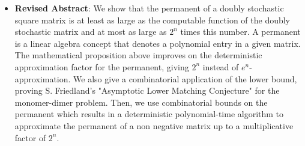 \documentclass[11pt,twocolumn]{article}
\begin{document}
\begin{itemize}
  \item{\bf{Revised Abstract}}: We show that the permanent of a doubly stochastic square matrix  is at least as large as the computable function of the doubly stochastic matrix and at most as large as $2^n$ times this number. A permanent is a linear algebra concept that denotes a polynomial entry in a given matrix. The mathematical proposition above improves on the deterministic approximation factor for the permanent, giving $2^n$ instead of $e^n$-approximation. We also give a combinatorial application of the lower bound, proving S. Friedland's "Asymptotic Lower Matching Conjecture" for the monomer-dimer problem. Then, we use combinatorial bounds on the permanent which results in a deterministic polynomial-time algorithm to approximate the permanent of a non negative matrix up to a multiplicative factor of $2^n$. \cite{bounds}  
  
\end{itemize}
\end{document}
